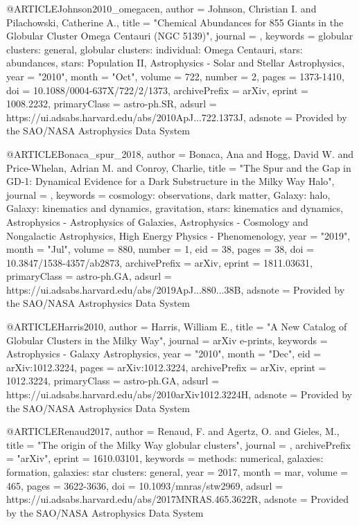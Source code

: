 \documentclass[apj]{emulateapj}
\begin{document}
{@ARTICLE{Johnson2010_omegacen,
       author = {{Johnson}, Christian I. and {Pilachowski}, Catherine A.},
        title = "{Chemical Abundances for 855 Giants in the Globular Cluster Omega Centauri (NGC 5139)}",
      journal = {\apj},
     keywords = {globular clusters: general, globular clusters: individual: Omega Centauri, stars: abundances, stars: Population II, Astrophysics - Solar and Stellar Astrophysics},
         year = "2010",
        month = "Oct",
       volume = {722},
       number = {2},
        pages = {1373-1410},
          doi = {10.1088/0004-637X/722/2/1373},
archivePrefix = {arXiv},
       eprint = {1008.2232},
 primaryClass = {astro-ph.SR},
       adsurl = {https://ui.adsabs.harvard.edu/abs/2010ApJ...722.1373J},
      adsnote = {Provided by the SAO/NASA Astrophysics Data System}
}




@ARTICLE{Bonaca_spur_2018,
       author = {{Bonaca}, Ana and {Hogg}, David W. and {Price-Whelan}, Adrian M. and
         {Conroy}, Charlie},
        title = "{The Spur and the Gap in GD-1: Dynamical Evidence for a Dark Substructure in the Milky Way Halo}",
      journal = {\apj},
     keywords = {cosmology: observations, dark matter, Galaxy: halo, Galaxy: kinematics and dynamics, gravitation, stars: kinematics and dynamics, Astrophysics - Astrophysics of Galaxies, Astrophysics - Cosmology and Nongalactic Astrophysics, High Energy Physics - Phenomenology},
         year = "2019",
        month = "Jul",
       volume = {880},
       number = {1},
          eid = {38},
        pages = {38},
          doi = {10.3847/1538-4357/ab2873},
archivePrefix = {arXiv},
       eprint = {1811.03631},
 primaryClass = {astro-ph.GA},
       adsurl = {https://ui.adsabs.harvard.edu/abs/2019ApJ...880...38B},
      adsnote = {Provided by the SAO/NASA Astrophysics Data System}
}


@ARTICLE{Harris2010,
       author = {{Harris}, William E.},
        title = "{A New Catalog of Globular Clusters in the Milky Way}",
      journal = {arXiv e-prints},
     keywords = {Astrophysics - Galaxy Astrophysics},
         year = "2010",
        month = "Dec",
          eid = {arXiv:1012.3224},
        pages = {arXiv:1012.3224},
archivePrefix = {arXiv},
       eprint = {1012.3224},
 primaryClass = {astro-ph.GA},
       adsurl = {https://ui.adsabs.harvard.edu/abs/2010arXiv1012.3224H},
      adsnote = {Provided by the SAO/NASA Astrophysics Data System}
}


@ARTICLE{Renaud2017,
   author = {{Renaud}, F. and {Agertz}, O. and {Gieles}, M.},
    title = "{The origin of the Milky Way globular clusters}",
  journal = {\mnras},
archivePrefix = "arXiv",
   eprint = {1610.03101},
 keywords = {methods: numerical, galaxies: formation, galaxies: star clusters: general},
     year = 2017,
    month = mar,
   volume = 465,
    pages = {3622-3636},
      doi = {10.1093/mnras/stw2969},
   adsurl = {https://ui.adsabs.harvard.edu/abs/2017MNRAS.465.3622R},
  adsnote = {Provided by the SAO/NASA Astrophysics Data System}
}




}
\end{document}

